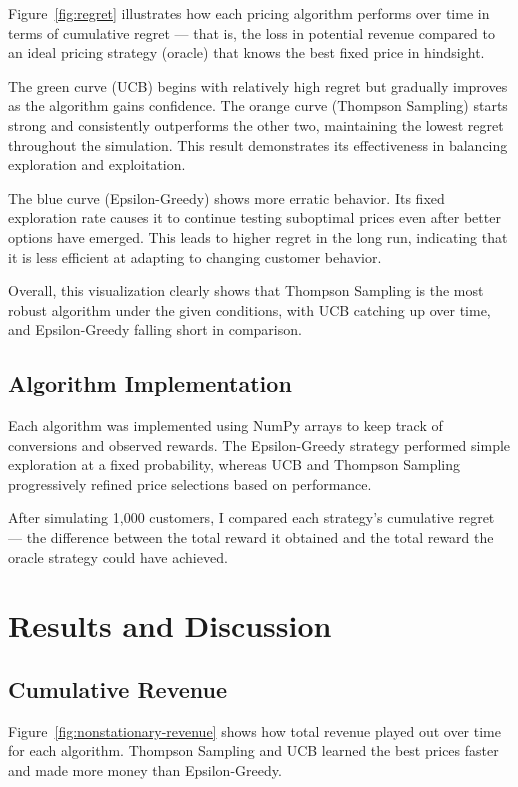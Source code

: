 \documentclass[12pt]{article}
\begin{document}
Figure~\ref{fig:regret} illustrates how each pricing algorithm performs over time in terms of cumulative regret — that is, the loss in potential revenue compared to an ideal pricing strategy (oracle) that knows the best fixed price in hindsight.

The green curve (UCB) begins with relatively high regret but gradually improves as the algorithm gains confidence. The orange curve (Thompson Sampling) starts strong and consistently outperforms the other two, maintaining the lowest regret throughout the simulation. This result demonstrates its effectiveness in balancing exploration and exploitation.

The blue curve (Epsilon-Greedy) shows more erratic behavior. Its fixed exploration rate causes it to continue testing suboptimal prices even after better options have emerged. This leads to higher regret in the long run, indicating that it is less efficient at adapting to changing customer behavior. 

Overall, this visualization clearly shows that Thompson Sampling is the most robust algorithm under the given conditions, with UCB catching up over time, and Epsilon-Greedy falling short in comparison.

\subsection{Algorithm Implementation}

Each algorithm was implemented using NumPy arrays to keep track of conversions and observed rewards. The Epsilon-Greedy strategy performed simple exploration at a fixed probability, whereas UCB and Thompson Sampling progressively refined price selections based on performance.

After simulating 1,000 customers, I compared each strategy's cumulative regret — the difference between the total reward it obtained and the total reward the oracle strategy could have achieved.

\section{Results and Discussion}

\subsection*{Cumulative Revenue}
Figure~\ref{fig:nonstationary-revenue} shows how total revenue played out over time for each algorithm. Thompson Sampling and UCB learned the best prices faster and made more money than Epsilon-Greedy.
\end{document}
